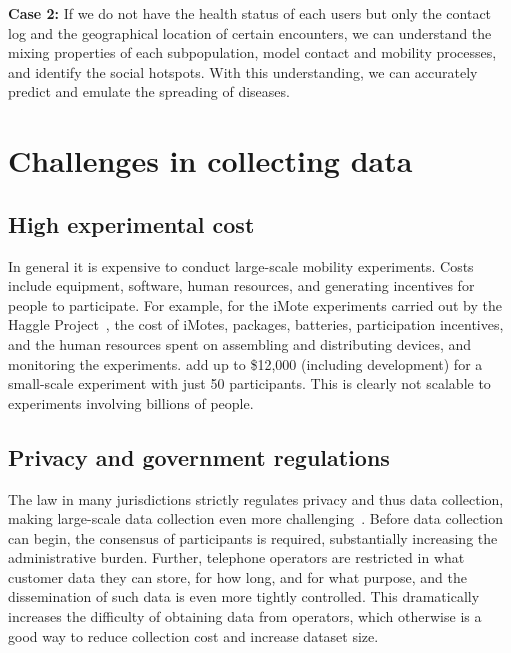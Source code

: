 \documentclass{sig-alternate-10pt}
\begin{document}
\textbf{Case 2:} If we do not have the health status of each users but
only the contact log and the geographical location of certain
encounters, we can understand the mixing properties of each
subpopulation, model contact and mobility processes, and identify the
social hotspots. With this understanding, we can accurately predict
and emulate the spreading of diseases.
\vspace{-1mm}
\section{Challenges in collecting data}
\vspace{-2mm}
\subsection{High experimental cost}
In general it is expensive to conduct large-scale mobility
experiments.  Costs include equipment, software, human resources, and
generating incentives for people to participate.  For example, for the
iMote experiments carried out by the Haggle
Project~\cite{psn-mobihoc}, the cost of iMotes, packages, batteries,
participation incentives, and the human resources spent on
assembling and distributing devices, and monitoring the experiments.
add up to \$12,000 (including development) for a
small-scale experiment with just 50 participants. This is clearly not scalable to
experiments involving billions of people.
\vspace{-1mm}
\subsection{Privacy and government regulations}
\vspace{-1mm}
The law in many jurisdictions strictly regulates privacy and thus data collection,
making large-scale data collection even more
challenging~\cite{henderson:hotplanet}.  Before data collection can
begin, the consensus of participants is required, substantially
increasing the administrative burden.  Further, telephone operators
are restricted in what customer data they can store, for how long, and
for what purpose, and the dissemination of such data is even more
tightly controlled.  This dramatically increases the difficulty of
obtaining data from operators, which otherwise is a good way to reduce
collection cost and increase dataset size.

\vspace{-1mm}
\end{document}
